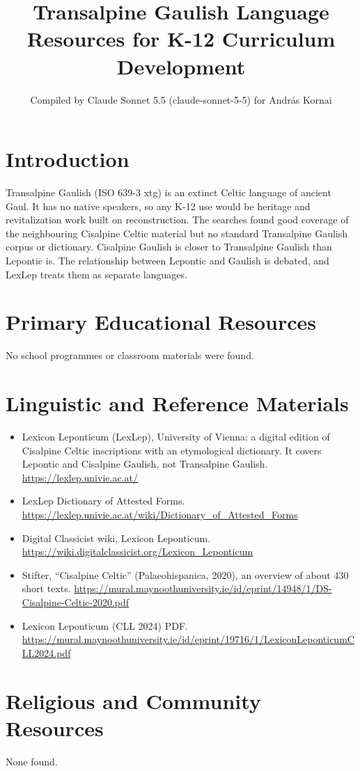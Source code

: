 \documentclass[12pt]{article}
\title{Transalpine Gaulish Language Resources for K-12 Curriculum Development}
\author{Compiled by Claude Sonnet 5.5 (claude-sonnet-5-5) for Andr\'as Kornai}
\date{}
\begin{document}
\maketitle

\section{Introduction}
Transalpine Gaulish (ISO 639-3 xtg) is an extinct Celtic language of ancient Gaul. It has no native speakers, so any K-12 use would be heritage and revitalization work built on reconstruction. The searches found good coverage of the neighbouring Cisalpine Celtic material but no standard Transalpine Gaulish corpus or dictionary. Cisalpine Gaulish is closer to Transalpine Gaulish than Lepontic is. The relationship between Lepontic and Gaulish is debated, and LexLep treats them as separate languages.

\section{Primary Educational Resources}
No school programmes or classroom materials were found.

\section{Linguistic and Reference Materials}
\begin{itemize}
\item Lexicon Leponticum (LexLep), University of Vienna: a digital edition of Cisalpine Celtic inscriptions with an etymological dictionary. It covers Lepontic and Cisalpine Gaulish, not Transalpine Gaulish. \url{https://lexlep.univie.ac.at/}
\item LexLep Dictionary of Attested Forms. \url{https://lexlep.univie.ac.at/wiki/Dictionary_of_Attested_Forms}
\item Digital Classicist wiki, Lexicon Leponticum. \url{https://wiki.digitalclassicist.org/Lexicon_Leponticum}
\item Stifter, ``Cisalpine Celtic'' (Palaeohispanica, 2020), an overview of about 430 short texts. \url{https://mural.maynoothuniversity.ie/id/eprint/14948/1/DS-Cisalpine-Celtic-2020.pdf}
\item Lexicon Leponticum (CLL 2024) PDF. \url{https://mural.maynoothuniversity.ie/id/eprint/19716/1/LexiconLeponticumCLL2024.pdf}
\end{itemize}

\section{Religious and Community Resources}
None found.
\end{document}
